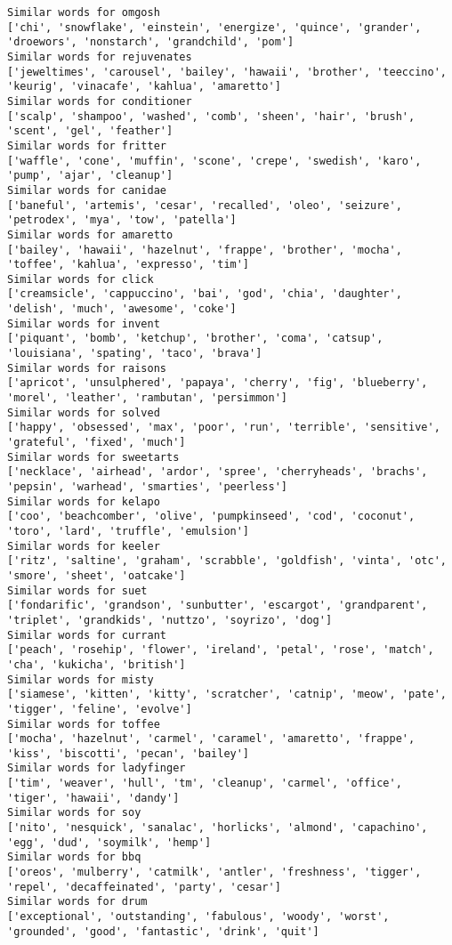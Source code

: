 \documentclass[11pt]{article}
\begin{document}
\begin{Verbatim}[commandchars=\\\{\}]
Similar words for omgosh
['chi', 'snowflake', 'einstein', 'energize', 'quince', 'grander', 'droewors', 'nonstarch', 'grandchild', 'pom']
Similar words for rejuvenates
['jeweltimes', 'carousel', 'bailey', 'hawaii', 'brother', 'teeccino', 'keurig', 'vinacafe', 'kahlua', 'amaretto']
Similar words for conditioner
['scalp', 'shampoo', 'washed', 'comb', 'sheen', 'hair', 'brush', 'scent', 'gel', 'feather']
Similar words for fritter
['waffle', 'cone', 'muffin', 'scone', 'crepe', 'swedish', 'karo', 'pump', 'ajar', 'cleanup']
Similar words for canidae
['baneful', 'artemis', 'cesar', 'recalled', 'oleo', 'seizure', 'petrodex', 'mya', 'tow', 'patella']
Similar words for amaretto
['bailey', 'hawaii', 'hazelnut', 'frappe', 'brother', 'mocha', 'toffee', 'kahlua', 'expresso', 'tim']
Similar words for click
['creamsicle', 'cappuccino', 'bai', 'god', 'chia', 'daughter', 'delish', 'much', 'awesome', 'coke']
Similar words for invent
['piquant', 'bomb', 'ketchup', 'brother', 'coma', 'catsup', 'louisiana', 'spating', 'taco', 'brava']
Similar words for raisons
['apricot', 'unsulphered', 'papaya', 'cherry', 'fig', 'blueberry', 'morel', 'leather', 'rambutan', 'persimmon']
Similar words for solved
['happy', 'obsessed', 'max', 'poor', 'run', 'terrible', 'sensitive', 'grateful', 'fixed', 'much']
Similar words for sweetarts
['necklace', 'airhead', 'ardor', 'spree', 'cherryheads', 'brachs', 'pepsin', 'warhead', 'smarties', 'peerless']
Similar words for kelapo
['coo', 'beachcomber', 'olive', 'pumpkinseed', 'cod', 'coconut', 'toro', 'lard', 'truffle', 'emulsion']
Similar words for keeler
['ritz', 'saltine', 'graham', 'scrabble', 'goldfish', 'vinta', 'otc', 'smore', 'sheet', 'oatcake']
Similar words for suet
['fondarific', 'grandson', 'sunbutter', 'escargot', 'grandparent', 'triplet', 'grandkids', 'nuttzo', 'soyrizo', 'dog']
Similar words for currant
['peach', 'rosehip', 'flower', 'ireland', 'petal', 'rose', 'match', 'cha', 'kukicha', 'british']
Similar words for misty
['siamese', 'kitten', 'kitty', 'scratcher', 'catnip', 'meow', 'pate', 'tigger', 'feline', 'evolve']
Similar words for toffee
['mocha', 'hazelnut', 'carmel', 'caramel', 'amaretto', 'frappe', 'kiss', 'biscotti', 'pecan', 'bailey']
Similar words for ladyfinger
['tim', 'weaver', 'hull', 'tm', 'cleanup', 'carmel', 'office', 'tiger', 'hawaii', 'dandy']
Similar words for soy
['nito', 'nesquick', 'sanalac', 'horlicks', 'almond', 'capachino', 'egg', 'dud', 'soymilk', 'hemp']
Similar words for bbq
['oreos', 'mulberry', 'catmilk', 'antler', 'freshness', 'tigger', 'repel', 'decaffeinated', 'party', 'cesar']
Similar words for drum
['exceptional', 'outstanding', 'fabulous', 'woody', 'worst', 'grounded', 'good', 'fantastic', 'drink', 'quit']

\end{Verbatim}
\end{document}
